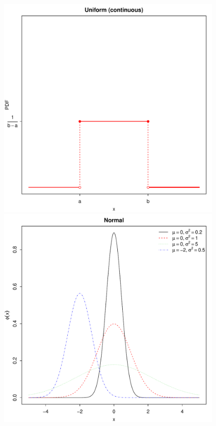 \documentclass[landscape]{article}
\begin{document}
\begin{figure}[H]
  \includegraphics[scale=0.35]{figs/uniform-continuous.pdf}
  \includegraphics[scale=0.35]{figs/normal.pdf}

\end{figure}
\end{document}
